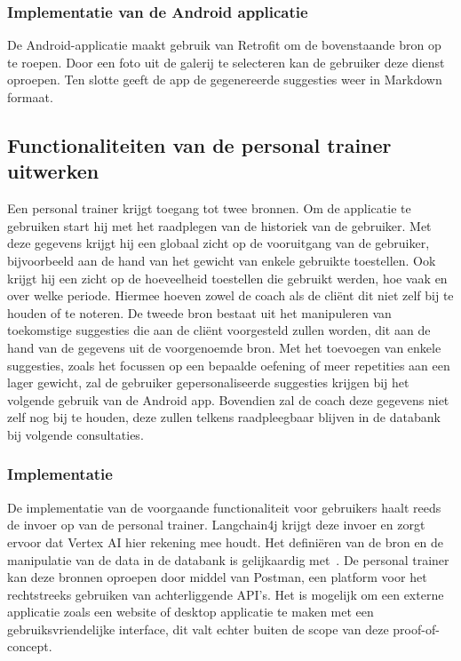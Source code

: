 \subsubsection{Implementatie van de Android applicatie}
De Android-applicatie maakt gebruik van Retrofit om de bovenstaande bron op te roepen.
Door een foto uit de galerij te selecteren kan de gebruiker deze dienst oproepen.
Ten slotte geeft de app de gegenereerde suggesties weer in Markdown formaat.

\subsection{Functionaliteiten van de personal trainer uitwerken}
\label{subsec:functionaliteiten-van-de-personal-trainer-uitwerken}
Een personal trainer krijgt toegang tot twee bronnen.
Om de applicatie te gebruiken start hij met het raadplegen van de historiek van de gebruiker.
Met deze gegevens krijgt hij een globaal zicht op de vooruitgang van de gebruiker, bijvoorbeeld aan de hand van het gewicht van enkele gebruikte toestellen.
Ook krijgt hij een zicht op de hoeveelheid toestellen die gebruikt werden, hoe vaak en over welke periode.
Hiermee hoeven zowel de coach als de cliënt dit niet zelf bij te houden of te noteren.
De tweede bron bestaat uit het manipuleren van toekomstige suggesties die aan de cliënt voorgesteld zullen worden, dit aan de hand van de gegevens uit de voorgenoemde bron.
Met het toevoegen van enkele suggesties, zoals het focussen op een bepaalde oefening of meer repetities aan een lager gewicht, zal de gebruiker gepersonaliseerde suggesties krijgen bij het volgende gebruik van de Android app.
Bovendien zal de coach deze gegevens niet zelf nog bij te houden, deze zullen telkens raadpleegbaar blijven in de databank bij volgende consultaties.

\subsubsection{Implementatie}
De implementatie van de voorgaande functionaliteit voor gebruikers haalt reeds de invoer op van de personal trainer.
Langchain4j krijgt deze invoer en zorgt ervoor dat Vertex AI hier rekening mee houdt.
Het definiëren van de bron en de manipulatie van de data in de databank is gelijkaardig met~.
De personal trainer kan deze bronnen oproepen door middel van Postman, een platform voor het rechtstreeks gebruiken van achterliggende API's.
Het is mogelijk om een externe applicatie zoals een website of desktop applicatie te maken met een gebruiksvriendelijke interface, dit valt echter buiten de scope van deze proof-of-concept.

